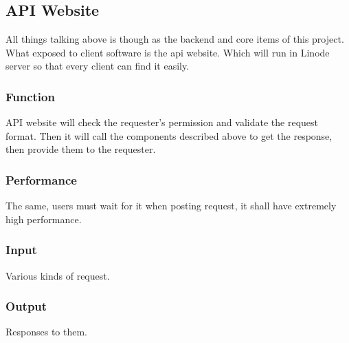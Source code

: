 
\subsection{API Website}
  All things talking above is though as the backend and core items of this project.
  What exposed to client software is the api website. Which will run in Linode server so that every client can find it easily.

  \subsubsection{Function}
    API website will check the requester's permission and validate the request format.
    Then it will call the components described above to get the response, then provide them to the requester.

  \subsubsection{Performance}
    The same, users must wait for it when posting request, it shall have extremely high performance.

  \subsubsection{Input}
    Various kinds of request.

  \subsubsection{Output}
    Responses to them.

